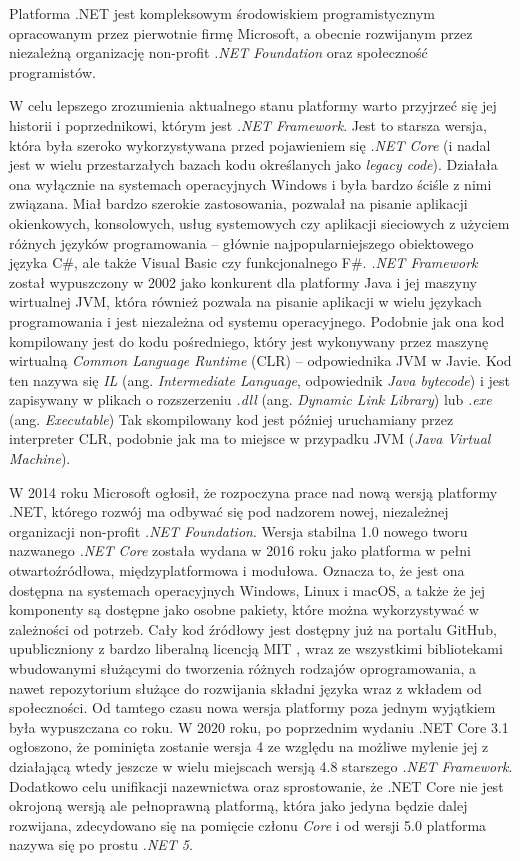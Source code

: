 Platforma .NET jest kompleksowym środowiskiem programistycznym opracowanym przez pierwotnie firmę Microsoft, a obecnie rozwijanym przez niezależną organizację non-profit \emph{.NET Foundation} oraz społeczność programistów.

W celu lepszego zrozumienia aktualnego stanu platformy warto przyjrzeć się jej historii i poprzednikowi, którym jest \emph{.NET Framework}.
Jest to starsza wersja, która była szeroko wykorzystywana przed pojawieniem się \emph{.NET Core} (i nadal jest w wielu przestarzałych bazach kodu określanych jako \emph{legacy code}).
Działała ona wyłącznie na systemach operacyjnych Windows i była bardzo ściśle z nimi związana.
Miał bardzo szerokie zastosowania, pozwalał na pisanie aplikacji okienkowych, konsolowych, usług systemowych czy aplikacji sieciowych z użyciem różnych języków programowania -- głównie najpopularniejszego obiektowego języka C\#, ale także Visual Basic czy funkcjonalnego F\#.
\emph{.NET Framework} został wypuszczony w 2002 jako konkurent dla platformy Java i jej maszyny wirtualnej JVM, która również pozwala na pisanie aplikacji w wielu językach programowania i jest niezależna od systemu operacyjnego.
Podobnie jak ona kod kompilowany jest do kodu pośredniego, który jest wykonywany przez maszynę wirtualną \emph{Common Language Runtime} (CLR) -- odpowiednika JVM w Javie.
Kod ten nazywa się \emph{IL} (ang. \emph{Intermediate Language}, odpowiednik \emph{Java bytecode}) i jest zapisywany w plikach o rozszerzeniu \emph{.dll} (ang. \emph{Dynamic Link Library}) lub \emph{.exe} (ang. \emph{Executable})
Tak skompilowany kod jest później uruchamiany przez interpreter CLR, podobnie jak ma to miejsce w przypadku JVM (\emph{Java Virtual Machine}).

W 2014 roku Microsoft ogłosił, że rozpoczyna prace nad nową wersją platformy .NET, którego rozwój ma odbywać się pod nadzorem nowej, niezależnej organizacji non-profit \emph{.NET Foundation}.
Wersja stabilna 1.0 nowego tworu nazwanego \emph{.NET Core} została wydana w 2016 roku jako platforma w pełni otwartoźródłowa, międzyplatformowa i modułowa.
Oznacza to, że jest ona dostępna na systemach operacyjnych Windows, Linux i macOS, a także że jej komponenty są dostępne jako osobne pakiety, które można wykorzystywać w zależności od potrzeb.
Cały kod źródłowy jest dostępny już na portalu GitHub, upubliczniony z bardzo liberalną licencją MIT \cite{dotnet-sdk-repo, dotnet-runtime-repo}, wraz ze wszystkimi bibliotekami wbudowanymi służącymi do tworzenia różnych rodzajów oprogramowania, a nawet repozytorium służące do rozwijania składni języka wraz z wkładem od społeczności.
Od tamtego czasu nowa wersja platformy poza jednym wyjątkiem była wypuszczana co roku.
W 2020 roku, po poprzednim wydaniu .NET Core 3.1 ogłoszono, że pominięta zostanie wersja 4 ze względu na możliwe mylenie jej z działającą wtedy jeszcze w wielu miejscach wersją 4.8 starszego \emph{.NET Framework}.
Dodatkowo celu unifikacji nazewnictwa oraz sprostowanie, że .NET Core nie jest okrojoną wersją ale pełnoprawną platformą, która jako jedyna będzie dalej rozwijana, zdecydowano się na pomięcie członu \emph{Core} i od wersji 5.0 platforma nazywa się po prostu \emph{.NET 5}.


